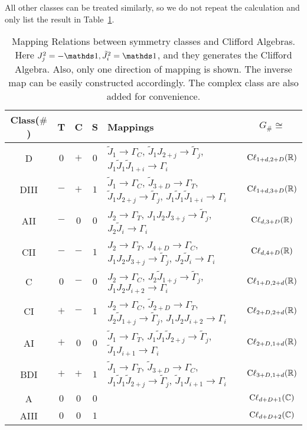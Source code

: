 \documentclass{article}
\begin{document}
All other classes can be treated similarly, so we do not repeat the calculation
and only list the result in Table~\ref{tab:map-sym-cl}.
\begin{table}[htpb]
    \centering
    \caption{Mapping Relations between symmetry classes and Clifford Algebras.
    Here $J_j^2=-\id,\tilde{J}_i^2=\id$, and they generates the Clifford
    Algebra. Also, only one direction of mapping is shown. The inverse map can
    be easily constructed accordingly. The complex class are also added for
    convenience.}
    \label{tab:map-sym-cl}
    \begin{tabular}{c | c c c | l | c }
        Class($\#$) & T & C & S & Mappings  & $G_\#\cong $ \\
        \hline 
        D & $0$ & $+$ & $0$ & 
        $\tilde{J}_1\to\Gamma_C$,
        $\tilde{J}_1J_{2+j}\to \tilde{\Gamma}_j$,
        $J_1\tilde{J}_1\tilde{J}_{1+i}\to \Gamma_i$ &
        $\mathrm{C\ell}_{1+d,2+D}(\mathbb{R})$ \\
        DIII & $-$ & $+$ & $1$ & 
        $\tilde{J}_1\to\Gamma_C$, $\tilde{J}_{3+D}\to\Gamma_T$,
        $\tilde{J}_1J_{2+j}\to \tilde{\Gamma}_j$,
        $J_1\tilde{J}_1\tilde{J}_{1+i}\to \Gamma_i$ &
        $\mathrm{C\ell}_{1+d,3+D}(\mathbb{R})$ \\
        AII & $-$ & $0$ & $0$ & 
        $J_2\to \Gamma_T$,
        $J_1J_2J_{3+j}\to \tilde{\Gamma}_j$,
        $J_2\tilde{J}_i \to \Gamma_i$
        & $\mathrm{C\ell}_{d,3+D}(\mathbb{R})$ \\
        CII & $-$ & $-$ & $1$ & 
        $J_2\to \Gamma_T$, $J_{4+D}\to \Gamma_C$,
        $J_1J_2J_{3+j}\to \tilde{\Gamma}_j$,
        $J_2\tilde{J}_i \to \Gamma_i$
        & $\mathrm{C\ell}_{d,4+D}(\mathbb{R})$ \\
        C & $0$ & $-$ & $0$ & 
        $J_2\to \Gamma_C$, 
        $J_2\tilde{J}_{1+j} \to \tilde{\Gamma}_j$,
        $J_1J_2J_{i+2}\to \Gamma_i$
        & $\mathrm{C\ell}_{1+D,2+d}(\mathbb{R})$ \\
        CI & $+$ & $-$ & $1$ & 
        $J_2\to \Gamma_C$, $\tilde{J}_{2+D}\to \Gamma_T$,
        $J_2\tilde{J}_{1+j} \to \tilde{\Gamma}_j$,
        $J_1J_2J_{i+2}\to \Gamma_i$
        & $\mathrm{C\ell}_{2+D,2+d}(\mathbb{R})$ \\
        AI & $+$ & $0$ & $0$ & 
        $\tilde{J}_1\to \Gamma_T$,
        $J_1\tilde{J}_1\tilde{J}_{2+j} \to \tilde{\Gamma}_j$,
        $\tilde{J}_1J_{i+1} \to \Gamma_i$
        & $\mathrm{C\ell}_{2+D,1+d}(\mathbb{R})$ \\
        BDI & $+$ & $+$ & $1$ & 
        $\tilde{J}_1\to \Gamma_T$, $\tilde{J}_{3+D}\to \Gamma_C$,
        $J_1\tilde{J}_1\tilde{J}_{2+j} \to \tilde{\Gamma}_j$,
        $\tilde{J}_1J_{i+1} \to \Gamma_i$
        & $\mathrm{C\ell}_{3+D,1+d}(\mathbb{R})$ \\
        \hline
        A & $0$ & $0$ & $0$ & 
        & $\mathrm{C\ell}_{d+D+1}(\mathbb{C})$ \\
        AIII & $0$ & $0$ & $1$ & 
        & $\mathrm{C\ell}_{d+D+2}(\mathbb{C})$ \\
        \hline
    \end{tabular}
\end{table}
\end{document}
